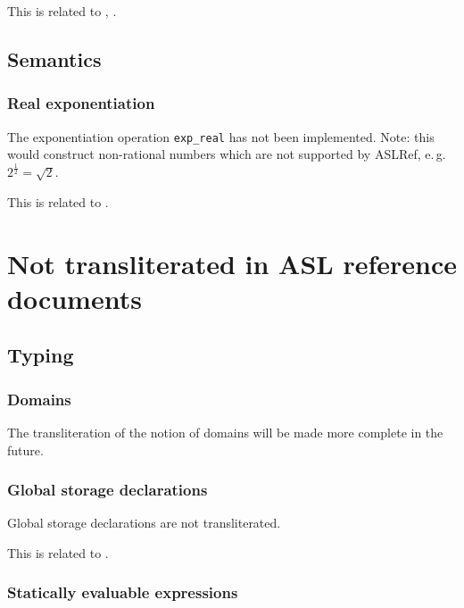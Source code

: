 \documentclass{book}
\begin{document}
This is related to , .

\section{Semantics}

\subsection{Real exponentiation}

The exponentiation operation \texttt{exp\_real} has not been implemented.
%
Note: this would construct non-rational numbers which are not supported by
ASLRef, e.\,g.\ $2^\frac{1}{2} = \sqrt{2}$.

This is related to .


\chapter{Not transliterated in ASL reference documents}

\section{Typing}

\subsection{Domains}

The transliteration of the notion of domains will be made more complete in the
future.

\subsection{Global storage declarations}

Global storage declarations are not transliterated.

This is related to .

\subsection{Statically evaluable expressions}
\end{document}
